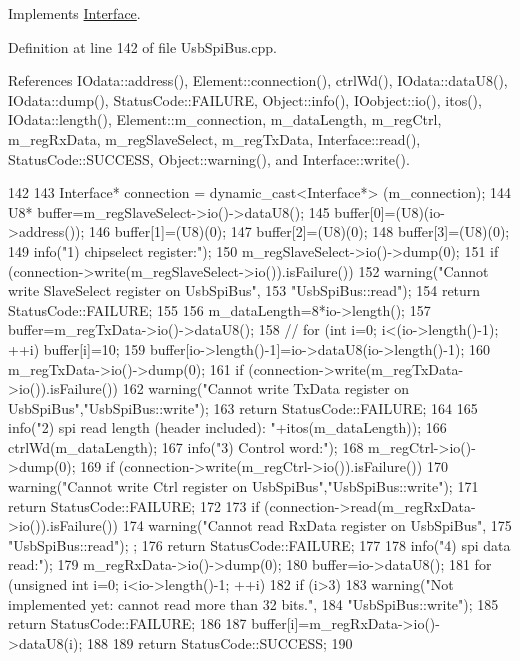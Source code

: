Implements \hyperlink{classInterface_a99136b67c8e6cbcaa0477c36940ac2ef}{Interface}.

Definition at line 142 of file UsbSpiBus.cpp.

References IOdata::address(), Element::connection(), ctrlWd(), IOdata::dataU8(), IOdata::dump(), StatusCode::FAILURE, Object::info(), IOobject::io(), itos(), IOdata::length(), Element::m\_\-connection, m\_\-dataLength, m\_\-regCtrl, m\_\-regRxData, m\_\-regSlaveSelect, m\_\-regTxData, Interface::read(), StatusCode::SUCCESS, Object::warning(), and Interface::write().


\begin{DoxyCode}
142                                     {
143   Interface* connection = dynamic_cast<Interface*> (m_connection);
144   U8* buffer=m_regSlaveSelect->io()->dataU8();
145   buffer[0]=(U8)(io->address());
146   buffer[1]=(U8)(0);
147   buffer[2]=(U8)(0);
148   buffer[3]=(U8)(0);
149   info("1) chipselect register:");
150   m_regSlaveSelect->io()->dump(0);
151   if (connection->write(m_regSlaveSelect->io()).isFailure()){
152     warning("Cannot write SlaveSelect register on UsbSpiBus",
153       "UsbSpiBus::read");
154     return StatusCode::FAILURE;
155   }
156   m_dataLength=8*io->length();
157   buffer=m_regTxData->io()->dataU8();
158   //  for (int i=0; i<(io->length()-1); ++i) buffer[i]=10;
159   buffer[io->length()-1]=io->dataU8(io->length()-1);
160   m_regTxData->io()->dump(0); 
161   if (connection->write(m_regTxData->io()).isFailure()){
162     warning("Cannot write TxData register on UsbSpiBus","UsbSpiBus::write");
163     return StatusCode::FAILURE;
164   }
165   info("2) spi read length (header included): "+itos(m_dataLength));
166   ctrlWd(m_dataLength);
167   info("3) Control word:");
168   m_regCtrl->io()->dump(0);
169   if (connection->write(m_regCtrl->io()).isFailure()){
170     warning("Cannot write Ctrl register on UsbSpiBus","UsbSpiBus::write");
171     return StatusCode::FAILURE;
172   }
173   if (connection->read(m_regRxData->io()).isFailure()){
174     warning("Cannot read RxData register on UsbSpiBus",
175         "UsbSpiBus::read");  ;
176     return StatusCode::FAILURE;
177   }
178   info("4) spi data read:");
179   m_regRxData->io()->dump(0);
180   buffer=io->dataU8();
181   for (unsigned int i=0; i<io->length()-1; ++i){
182     if (i>3) {
183       warning("Not implemented yet: cannot read more than 32 bits.",
184           "UsbSpiBus::write");
185       return StatusCode::FAILURE;
186     }
187     buffer[i]=m_regRxData->io()->dataU8(i);    
188   }
189   return StatusCode::SUCCESS;
190 }
\end{DoxyCode}
